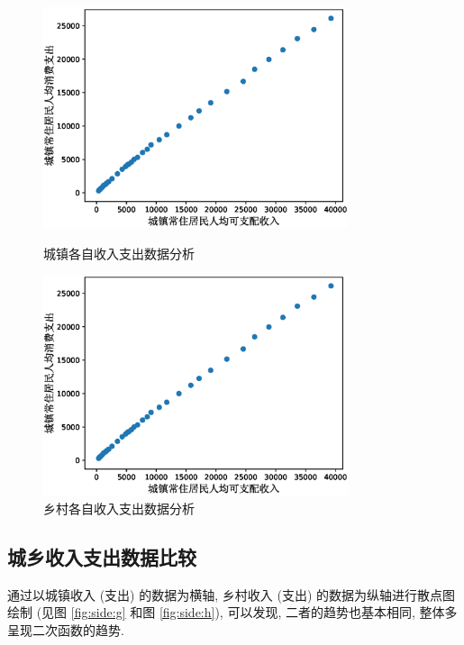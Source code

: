 \documentclass{article}
\begin{document}
\begin{figure}[H]
  \centering
  \begin{minipage}[t]{0.48\textwidth}
    \centering
    \includegraphics[width=0.8\textwidth]{figures/comparison1.eps}
    \caption{城镇各自收入支出数据分析}
    \label{fig:side:e}
  \end{minipage}
  \begin{minipage}[t]{0.48\textwidth}
    \centering
    \includegraphics[width=0.8\textwidth]{figures/comparison1.eps}
    \caption{乡村各自收入支出数据分析}
    \label{fig:side:f}
  \end{minipage}
\end{figure}

\subsection{城乡收入支出数据比较}

通过以城镇收入 (支出) 的数据为横轴, 乡村收入 (支出) 的数据为纵轴进行散点图绘制 (见图 \ref{fig:side:g} 和图 \ref{fig:side:h}), 可以发现, 二者的趋势也基本相同, 整体多呈现二次函数的趋势.\\
\end{document}
